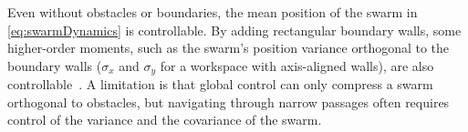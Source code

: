 Even without obstacles or boundaries, the mean position of the swarm in \eqref{eq:swarmDynamics} is controllable.  By adding rectangular boundary walls, some higher-order moments, such as the swarm's position variance orthogonal to the boundary walls ($\sigma_x$ and $\sigma_y$ for a workspace with axis-aligned walls), are also controllable~\citep{ShahrokhiIROS2015}. 
A limitation is that global control can only compress a swarm orthogonal to obstacles, but navigating through narrow passages often requires control of the variance and the covariance of the swarm.


